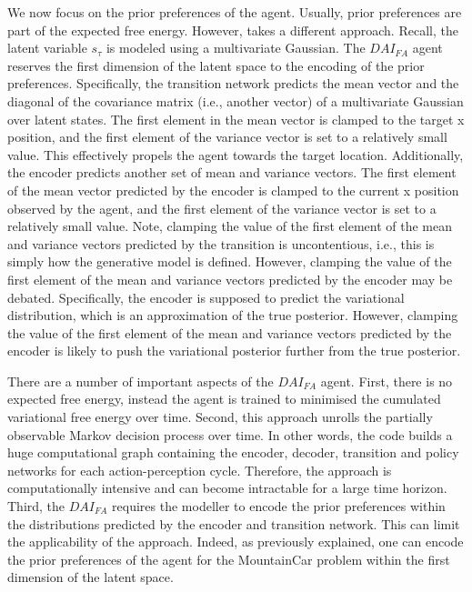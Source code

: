 \documentclass[twoside,11pt]{article}
\begin{document}
We now focus on the prior preferences of the agent. Usually, prior preferences are part of the expected free energy. However, \citet{DAI_Kai} takes a different approach. Recall, the latent variable $s_\tau$ is modeled using a multivariate Gaussian. The $DAI_{FA}$ agent reserves the first dimension of the latent space to the encoding of the prior preferences. Specifically, the transition network predicts the mean vector and the diagonal of the covariance matrix (i.e., another vector) of a multivariate Gaussian over latent states. The first element in the mean vector is clamped to the target x position, and the first element of the variance vector is set to a relatively small value. This effectively propels the agent towards the target location. Additionally, the encoder predicts another set of mean and variance vectors. The first element of the mean vector predicted by the encoder is clamped to the current x position observed by the agent, and the first element of the variance vector is set to a relatively small value. Note, clamping the value of the first element of the mean and variance vectors predicted by the transition is uncontentious, i.e., this is simply how the generative model is defined. However, clamping the value of the first element of the mean and variance vectors predicted by the encoder may be debated. Specifically, the encoder is supposed to predict the variational distribution, which is an approximation of the true posterior. However, clamping the value of the first element of the mean and variance vectors predicted by the encoder is likely to push the variational posterior further from the true posterior.

There are a number of important aspects of the $DAI_{FA}$ agent. First, there is no expected free energy, instead the agent is trained to minimised the cumulated variational free energy over time. Second, this approach unrolls the partially observable Markov decision process over time. In other words, the code builds a huge computational graph containing the encoder, decoder, transition and policy networks for each action-perception cycle. Therefore, the approach is computationally intensive and can become intractable for a large time horizon. Third, the $DAI_{FA}$ requires the modeller to encode the prior preferences within the distributions predicted by the encoder and transition network. This can limit the applicability of the approach. Indeed, as previously explained, one can encode the prior preferences of the agent for the MountainCar problem within the first dimension of the latent space. 
\end{document}
